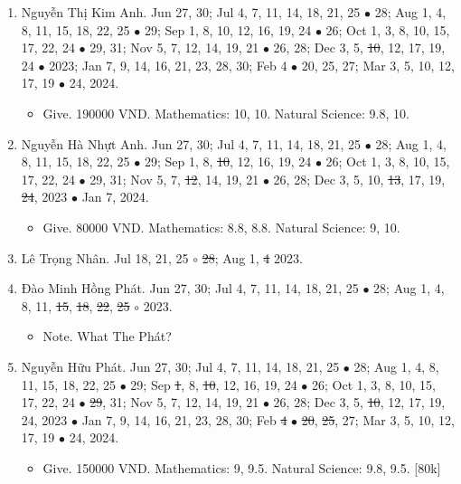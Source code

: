 \documentclass{article}
\begin{document}
\begin{enumerate}
	\item {\sc Nguyễn Thị Kim Anh.} {\sf[In]} Jun 27, 30; Jul 4, 7, 11, 14, 18, 21, 25 $\bullet$ 28; Aug 1, 4, 8, 11, 15, 18, 22, 25 $\bullet$ 29; Sep 1, 8, 10, 12, 16, 19, 24 $\bullet$ 26; Oct 1, 3, 8, 10, 15, 17, 22, 24 $\bullet$ 29, 31; Nov 5, 7, 12, 14, 19, 21 $\bullet$ 26, 28; Dec 3, 5, \st{10}, 12, 17, 19, 24 $\bullet$ 2023; Jan 7, 9, 14, 16, 21, 23, 28, 30; Feb 4 $\bullet$ 20, 25, 27; Mar 3, 5, 10, 12, 17, 19 $\bullet$ 24, 2024.
	\begin{itemize}
		\item {\sf Give.} 190000 VND. Mathematics: 10, 10. Natural Science: 9.8, 10.
	\end{itemize}
	\item {\sc Nguyễn Hà Nhựt Anh.} {\sf[In]} Jun 27, 30; Jul 4, 7, 11, 14, 18, 21, 25 $\bullet$ 28; Aug 1, 4, 8, 11, 15, 18, 22, 25 $\bullet$ 29; Sep 1, 8, \st{10}, 12, 16, 19, 24 $\bullet$ 26; Oct 1, 3, 8, 10, 15, 17, 22, 24 $\bullet$ 29, 31; Nov 5, 7, \st{12}, 14, 19, 21 $\bullet$ 26, 28; Dec 3, 5, 10, \st{13}, 17, 19, \st{24}, 2023 $\bullet$ Jan 7, 2024. {\sf[Out]}
	\begin{itemize}
		\item {\sf Give.} 80000 VND. Mathematics: 8.8, 8.8. Natural Science: 9, 10.
	\end{itemize}
	\item {\sc Lê Trọng Nhân.} {\sf[In]} Jul 18, 21, 25 $\circ$ \st{28}; Aug 1, \st{4} 2023. \sf{[Out]}
	\item {\sc Đào Minh Hồng Phát.} {\sf[In]} Jun 27, 30; Jul 4, 7, 11, 14, 18, 21, 25 $\bullet$ 28; Aug 1, 4, 8, 11, \st{15}, \st{18}, \st{22}, \st{25} $\circ$ 2023. \sf{[Out]}
	\begin{itemize}
		\item {\sf Note.} What The Phát?
	\end{itemize}
	\item {\sc Nguyễn Hữu Phát.} {\sf[In]} Jun 27, 30; Jul 4, 7, 11, 14, 18, 21, 25 $\bullet$ 28; Aug 1, 4, 8, 11, 15, 18, 22, 25 $\bullet$ 29; Sep \st{1}, 8, \st{10}, 12, 16, 19, 24 $\bullet$ 26; Oct 1, 3, 8, 10, 15, 17, 22, 24 $\bullet$ \st{29}, 31; Nov 5, 7, 12, 14, 19, 21 $\bullet$ 26, 28; Dec 3, 5, \st{10}, 12, 17, 19, 24, 2023 $\bullet$ Jan 7, 9, 14, 16, 21, 23, 28, 30; Feb \st{4} $\bullet$ \st{20}, \st{25}, 27; Mar 3, 5, 10, 12, 17, 19 $\bullet$ 24, 2024.
	\begin{itemize}
		\item {\sf Give.} 150000 VND. Mathematics: 9, 9.5. Natural Science: 9.8, 9.5. [80k]

\end{itemize}
\end{enumerate}
\end{document}
